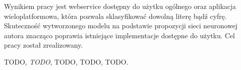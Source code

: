 \documentclass[brudnopis]{xmgr}
\begin{document}
Wynikiem pracy jest webservice dostępny do użytku ogólnego oraz aplikacja wieloplatformowa, która pozwala sklasyfikować dowolną literę bądź cyfrę. Skuteczność wytworzonego modelu na podstawie propozycji sieci neuronowej autora znacząco poprawia istniejące implementacje dostępne do użytku. Cel pracy został zrealizowany.




\begin{thebibliography}{9}

  TODO,
  \emph{TODO},
  TODO,
  TODO,
  TODO.

\end{thebibliography}

\oswiadczenie
\end{document}
